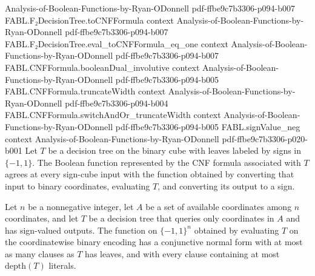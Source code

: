 \begin{theorem}
  {Analysis-of-Boolean-Functions-by-Ryan-ODonnell}
  {pdf-ffbe9c7b3306-p094-b007}
\proofstep
  {FABL.F₂DecisionTree.toCNFFormula}
  {context}
  {Analysis-of-Boolean-Functions-by-Ryan-ODonnell}
  {pdf-ffbe9c7b3306-p094-b007}
\proofstep
  {FABL.F₂DecisionTree.eval_toCNFFormula_eq_one}
  {context}
  {Analysis-of-Boolean-Functions-by-Ryan-ODonnell}
  {pdf-ffbe9c7b3306-p094-b007}
\proofstep
  {FABL.CNFFormula.booleanDual_involutive}
  {context}
  {Analysis-of-Boolean-Functions-by-Ryan-ODonnell}
  {pdf-ffbe9c7b3306-p094-b005}
\proofstep
  {FABL.CNFFormula.truncateWidth}
  {context}
  {Analysis-of-Boolean-Functions-by-Ryan-ODonnell}
  {pdf-ffbe9c7b3306-p094-b004}
\proofstep
  {FABL.CNFFormula.switchAndOr_truncateWidth}
  {context}
  {Analysis-of-Boolean-Functions-by-Ryan-ODonnell}
  {pdf-ffbe9c7b3306-p094-b005}
\proofstep
  {FABL.signValue_neg}
  {context}
  {Analysis-of-Boolean-Functions-by-Ryan-ODonnell}
  {pdf-ffbe9c7b3306-p020-b001}
Let $T$ be a decision tree on the binary cube with leaves labeled by signs in $\{
-1,1\}$. The Boolean function represented by the CNF formula associated with $T$ agrees
at every sign-cube input with the function obtained by converting that input to binary
coordinates, evaluating $T$, and converting its output to a sign.
\end{theorem}

\begin{theorem}
\leanok
{}
Let $n$ be a nonnegative integer, let $A$ be a set of available coordinates among $n$
coordinates, and let $T$ be a decision tree that queries only coordinates in $A$ and has
sign-valued outputs. The function on $\{−1,1\}^n$ obtained by evaluating $T$ on the
coordinatewise binary encoding has a conjunctive normal form with at most as many
clauses as $T$ has leaves, and with every clause containing at most $\mathrm{depth}(T)$
literals.
\end{theorem}


